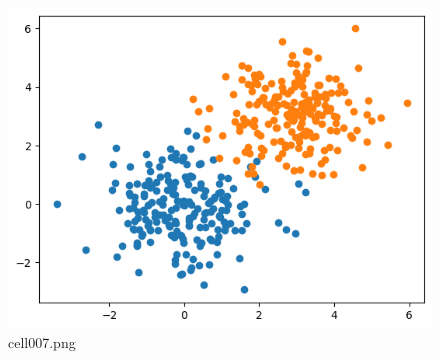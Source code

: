 \begin{figure}[ht]
	\centering
	\includegraphics[scale=0.8, max width=\linewidth]{./fig/local-learning-rule/logistic-regression-perceptron/cell007.png}
	\caption{cell007.png}
	\label{cell007.png}
\end{figure}